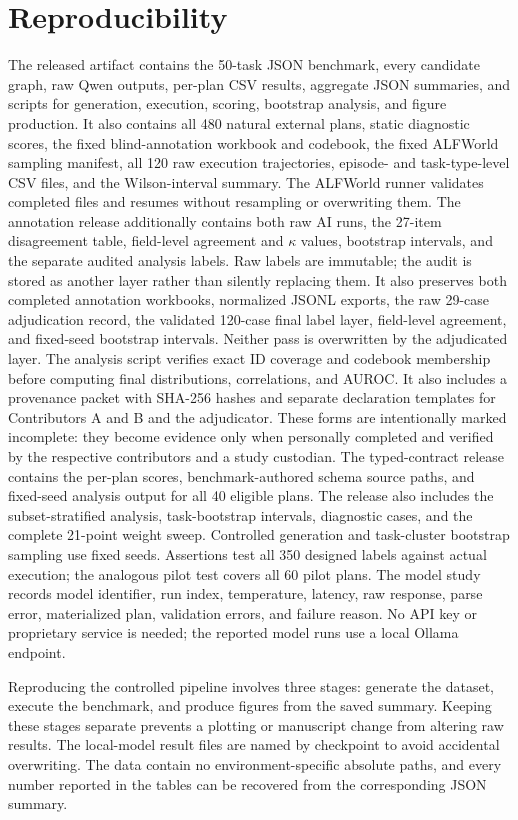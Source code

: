 \documentclass[10pt]{article}
\begin{document}
\section{Reproducibility}
The released artifact contains the 50-task JSON benchmark, every candidate
graph, raw Qwen outputs, per-plan CSV results, aggregate JSON summaries, and
scripts for generation, execution, scoring, bootstrap analysis, and figure
production.
It also contains all 480 natural external plans, static diagnostic scores, the
fixed blind-annotation workbook and codebook, the fixed ALFWorld sampling
manifest, all 120 raw execution
trajectories, episode- and task-type-level CSV files, and the Wilson-interval
summary. The ALFWorld runner validates completed files and resumes without
resampling or overwriting them.
The annotation release additionally contains both raw AI runs, the 27-item
disagreement table, field-level agreement and $\kappa$ values, bootstrap
intervals, and the separate audited analysis labels. Raw labels are immutable;
the audit is stored as another layer rather than silently replacing them.
It also preserves both completed annotation workbooks, normalized JSONL
exports, the raw 29-case adjudication record, the validated 120-case final label
layer, field-level agreement, and fixed-seed bootstrap intervals. Neither pass
is overwritten by the adjudicated layer. The analysis script verifies exact ID
coverage and codebook membership before computing final distributions,
correlations, and AUROC.
It also includes a provenance packet with SHA-256 hashes and separate
declaration templates for Contributors A and B and the adjudicator. These forms
are intentionally marked incomplete: they become evidence only when personally
completed and verified by the respective contributors and a study custodian.
The typed-contract release contains the per-plan scores, benchmark-authored
schema source paths, and fixed-seed analysis output for all 40 eligible plans.
The release also includes the subset-stratified analysis, task-bootstrap
intervals, diagnostic cases, and the complete 21-point weight sweep.
Controlled generation and task-cluster bootstrap sampling use fixed seeds. Assertions test
all 350 designed labels against actual execution; the analogous pilot test
covers all 60 pilot plans. The model study records model identifier, run index,
temperature, latency, raw response, parse error, materialized plan, validation
errors, and failure reason. No API key or proprietary service is needed; the
reported model runs use a local Ollama endpoint.

Reproducing the controlled pipeline involves three stages: generate the
dataset, execute the benchmark, and produce figures from the saved summary.
Keeping these stages separate prevents a plotting or manuscript change from
altering raw results. The local-model result files are named by checkpoint to
avoid accidental overwriting. The data contain no environment-specific
absolute paths, and every number reported in the tables can be recovered from
the corresponding JSON summary.
\end{document}
